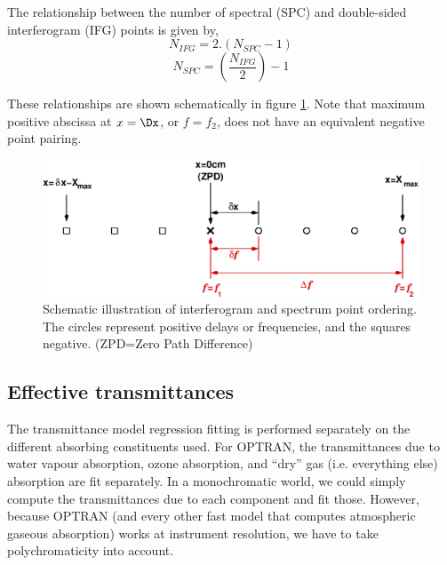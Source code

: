 The relationship between the number of spectral (SPC) and double-sided interferogram (IFG) points is given by,
\begin{equation}N_{IFG} = 2.(N_{SPC}-1)\end{equation}
\begin{equation}N_{SPC} = \left(\frac{N_{IFG}}{2}\right) - 1\end{equation}

These relationships are shown schematically in figure \ref{fig:X_F_defn}. Note that maximum positive abscissa at $x = \Dx$, or $f = f_{2}$, does not have an equivalent negative point pairing.
\begin{figure}[htp]
  \centering
  \includegraphics[scale=0.8]{graphics/X_F_definition.eps}
  \caption{Schematic illustration of interferogram and spectrum point ordering. The circles represent positive delays or frequencies, and the squares negative. (ZPD=Zero Path Difference)}
  \label{fig:X_F_defn}
\end{figure}


\subsection{Effective transmittances}
\label{sec:efftau}
The transmittance model regression fitting is performed separately on the different absorbing constituents used. For OPTRAN, the transmittances due to water vapour absorption, ozone absorption, and ``dry'' gas (i.e. everything else) absorption are fit separately. In a monochromatic world, we could simply compute the transmittances due to each component and fit those. However, because OPTRAN (and every other fast model that computes atmospheric gaseous absorption) works at instrument resolution, we have to take polychromaticity into account.

